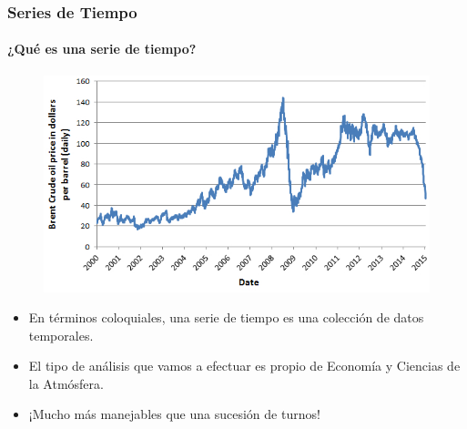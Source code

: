 \begin{frame}
  \frametitle{Series de Tiempo}
  \framesubtitle{¿Qué es una serie de tiempo?}

  \begin{figure}[t]
    \includegraphics[scale=0.35]{images/oil_price.jpg}
  \end{figure}

  \begin{itemize}
     \item En términos coloquiales, una serie de tiempo es una colección de datos temporales.
     \item El tipo de análisis que vamos a efectuar es propio de Economía y Ciencias de la Atmósfera.
     \item ¡Mucho más manejables que una sucesión de turnos!
   \end{itemize}
\end{frame}



